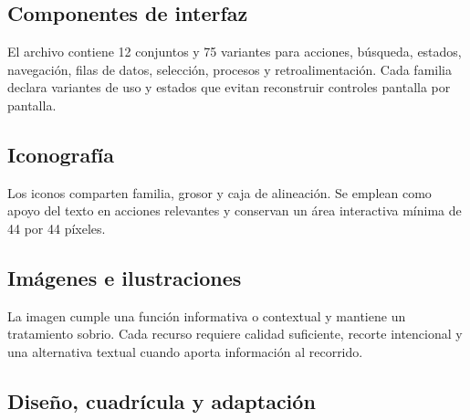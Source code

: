 \subsection{Componentes de interfaz}

El archivo contiene 12 conjuntos y 75 variantes para acciones, búsqueda, estados,
navegación, filas de datos, selección, procesos y retroalimentación. Cada familia declara
variantes de uso y estados que evitan reconstruir controles pantalla por pantalla.





\subsection{Iconografía}

Los iconos comparten familia, grosor y caja de alineación. Se emplean como apoyo del texto en
acciones relevantes y conservan un área interactiva mínima de 44 por 44 píxeles.


\subsection{Imágenes e ilustraciones}

La imagen cumple una función informativa o contextual y mantiene un tratamiento sobrio. Cada
recurso requiere calidad suficiente, recorte intencional y una alternativa textual cuando
aporta información al recorrido.

\subsection{Diseño, cuadrícula y adaptación}

